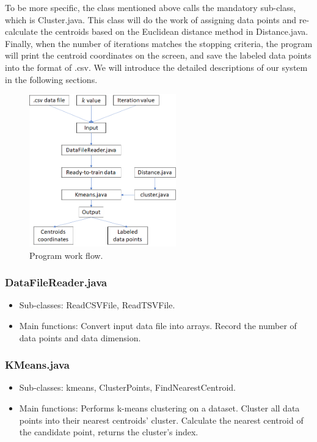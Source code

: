\documentclass[journal]{IEEEtran}
\begin{document}
To be more specific, the class mentioned above calls the mandatory sub-class, which is Cluster.java. This class will do the work of assigning data points and re-calculate the centroids based on the Euclidean distance method in Distance.java. Finally, when the number of iterations matches the stopping criteria, the program will print the centroid coordinates on the screen, and save the labeled data points into the format of .csv. We will introduce the detailed descriptions of our system in the following sections.

\begin{figure}[!t]
	\centering
	\includegraphics[width=2.5in]{image/workflow.png}
	\caption{Program work flow.}
	\label{fig_workflow}
\end{figure}

\subsubsection{DataFileReader.java}
\begin{itemize}
	\item Sub-classes: ReadCSVFile, ReadTSVFile.
	\item Main functions: 
	\subitem Convert input data file into arrays. 
	\subitem Record the number of data points and data dimension.
\end{itemize}

\subsubsection{KMeans.java}
\begin{itemize}
	\item Sub-classes: kmeans, ClusterPoints, FindNearestCentroid.
	\item Main functions:
	\subitem Performs k-means clustering on a dataset.
	\subitem Cluster all data points into their nearest centroids’ cluster.
	\subitem Calculate the nearest centroid of the candidate point, returns the cluster's index.
\end{itemize}
\end{document}
